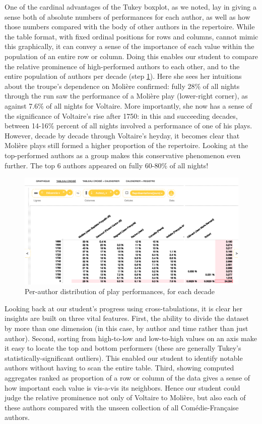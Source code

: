 \documentclass[	DIV=calc,%
							paper=a4,%
							fontsize=11pt,%
							twocolumn]{scrartcl}	 					%
\begin{document}
One of the cardinal advantages of the Tukey boxplot, as we noted, lay in giving a sense both of absolute numbers of performances for each author, as well as how those numbers compared with the body of other authors in the repertoire.  While the table format, with fixed ordinal positions for rows and columns, cannot mimic this graphically, it can convey a sense of the importance of each value within the population of an entire row or column.  Doing this enables our student to compare the relative prominence of high-performed authors to each other, and to the entire population of authors per decade (step \ref{fig:percents}).  Here she sees her intuitions about the troupe’s dependence on Molière confirmed: fully 28\% of all nights through the run saw the performance of a Molière play (lower-right corner), as against 7.6\% of all nights for Voltaire.  More importantly, she now has a sense of the significance of Voltaire’s rise after 1750: in this and succeeding decades, between 14-16\% percent of all nights involved a performance of one of his plays.  However, decade by decade through Voltaire’s heyday, it becomes clear that Molière plays still formed a higher proportion of the repertoire.  Looking at the top-performed authors as a group makes this conservative phenomenon even further.  The top 6 authors appeared on fully 60-80\% of all nights!

\begin{figure}
  \centering
	\includegraphics[width=7in]{steps/percents.png}
	\caption{Per-author distribution of play performances, for each decade}
	\label{fig:percents}
\end{figure}

Looking back at our student’s progress using cross-tabulations, it is clear her insights are built on three vital features.  First, the ability to divide the dataset by more than one dimension (in this case, by author and time rather than just author).  Second, sorting from high-to-low and low-to-high values on an axis make it easy to locate the top and bottom performers (these are generally Tukey’s statistically-significant outliers).  This enabled our student to identify notable authors without having to scan the entire table. Third, showing computed aggregates ranked as proportion of a row or column of the data gives a sense of how important each value is vis-a-vis its neighbors.  Hence our student could judge the relative prominence not only of Voltaire to Molière, but also each of these authors compared with the unseen collection of all Comédie-Française authors.
\end{document}
